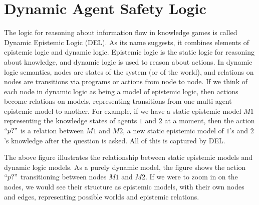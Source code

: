 \chapter{Dynamic Agent Safety Logic}
	\label{CH_03}



The logic for reasoning about information flow in knowledge games is called Dynamic Epistemic Logic (DEL). As its name suggests, it combines elements of epistemic logic and dynamic logic. Epistemic logic is the static logic for reasoning about knowledge, and dynamic logic is used to reason about actions. In dynamic logic semantics, nodes are states of the system (or of the world), and relations on nodes are transitions via programs or actions from node to node. If we think of each node in dynamic logic as being a model of epistemic logic, then actions become relations on models, representing transitions from one multi-agent epistemic model to another. For example, if we have a static epistemic model $M1$ representing the knowledge states of agents $1$ and $2$ at a moment, then the action $``p?"$ is a relation between $M1$ and $M2$, a new static epistemic model of $1$'s and $2$'s knowledge after the question is asked. All of this is captured by DEL.

\begin {center}
\end{center}

The above figure illustrates the relationship between static epistemic models and dynamic logic models. As a purely dynamic model, the figure shows the action $``p?"$ transitioning between nodes $M1$ and $M2$. If we were to zoom in on the nodes, we would see their structure as epistemic models, with their own nodes and edges, representing possible worlds and epistemic relations.

